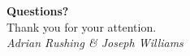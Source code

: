 \documentclass[11pt, aspectratio=169]{beamer}
\begin{document}
\begin{frame}
    \vspace{2cm}
    \begin{center}
        \Huge{\textbf{Questions?}} \\
        \vspace{1cm}
        \Large{Thank you for your attention.} \\
        \vspace{1.5cm}
        \normalsize{\textit{Adrian Rushing \& Joseph Williams}}
    \end{center}
\end{frame}
\end{document}
